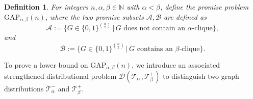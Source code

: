 \documentclass[10pt,a4paper]{article}
\newtheorem{definition}[theorem]{Definition}
\newcommand{\jnote}[1]{\todo[inline,backgroundcolor=blue!20!green]{#1 \\ \textsc{--Jarek}}}
\begin{document}
\begin{definition}
    For integers $n, \alpha, \beta\in \mathbb{N}$ with $ \alpha < \beta$, define the promise problem $\mathrm{GAP}_{\alpha, \beta}(n)$, where the two promise subsets $\mathcal{A}, \mathcal{B}$ are defined as
    $$\mathcal{A} := \{G \in \{0, 1\}^{\binom{n}{2}}\,|\, G \text{ does not contain an } \alpha \text{-clique}\},$$
    and
    $$\mathcal{B} := \{G \in \{0, 1\}^{\binom{n}{2}} \,|\, G \text{ contains an } \beta \text{-clique}\}.$$
\end{definition}


To prove a lower bound on $\mathrm{GAP}_{\alpha, \beta}(n)$, we introduce an associated strengthened distributional problem $\mathcal{D}(\mathcal{T}^-_\alpha, \mathcal{T}^+_\beta)$ to distinguish two graph distributions $\mathcal{T}^-_\alpha$ and $\mathcal{T}^+_\beta$.
\end{document}
